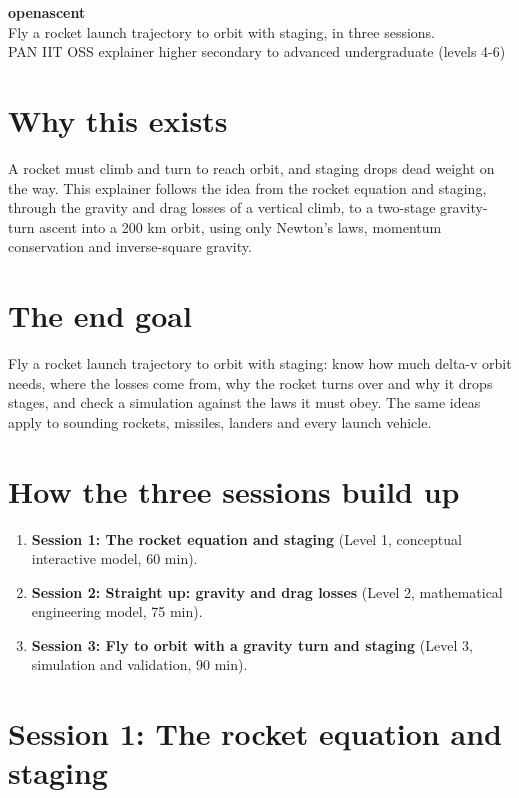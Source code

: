 \documentclass[11pt,a4paper]{article}
\begin{document}
\begin{center}{\LARGE\bfseries openascent}\\[0.4em]{\large Fly a rocket launch trajectory to orbit with staging, in three sessions.}\\[0.2em]\small PAN IIT OSS explainer \textbullet{} higher secondary to advanced undergraduate (levels 4-6)\end{center}

\section*{Why this exists}
A rocket must climb and turn to reach orbit, and staging drops dead weight on the way. This explainer follows the idea from the rocket equation and staging, through the gravity and drag losses of a vertical climb, to a two-stage gravity-turn ascent into a 200 km orbit, using only Newton's laws, momentum conservation and inverse-square gravity.

\section*{The end goal}
Fly a rocket launch trajectory to orbit with staging: know how much delta-v orbit needs, where the losses come from, why the rocket turns over and why it drops stages, and check a simulation against the laws it must obey. The same ideas apply to sounding rockets, missiles, landers and every launch vehicle.

\section*{How the three sessions build up}
\begin{enumerate}[nosep]
\item \textbf{Session 1: The rocket equation and staging} (Level 1, conceptual interactive model, 60 min).
\item \textbf{Session 2: Straight up: gravity and drag losses} (Level 2, mathematical engineering model, 75 min).
\item \textbf{Session 3: Fly to orbit with a gravity turn and staging} (Level 3, simulation and validation, 90 min).
\end{enumerate}

\section{Session 1: The rocket equation and staging}
\end{document}
